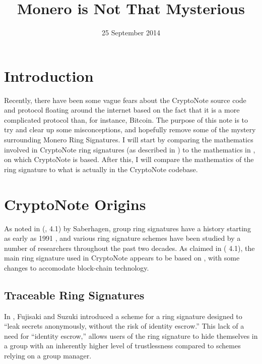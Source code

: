 \documentclass[12pt,english]{mrl}
\numberwithin{equation}{section}
\numberwithin{figure}{section}
\begin{document}
\begin{frontmatter}

\begin{fmbox}
\hfill\setlength{\fboxrule}{0px}\setlength{\fboxsep}{5px}
\title{Monero is Not That Mysterious}
\date{25 September 2014}
\author[
   addressref={mrl},
   email={lab@monero.cc}
]{ }


\address[id=mrl]{
}
\end{fmbox}



\end{frontmatter}

\section{Introduction}
Recently, there have been some vague fears about the CryptoNote
source code and protocol floating around the internet based on the
fact that it is a more complicated protocol than, for instance, Bitcoin.
The purpose of this note is to try and clear up some misconceptions,
and hopefully remove some of the mystery surrounding Monero Ring Signatures.
I will start by comparing the mathematics involved in CryptoNote
ring signatures (as described in \cite{CN}) to the mathematics in
\cite{FS}, on which CryptoNote is based. After this, I will compare
the mathematics of the ring signature to what is actually in the
CryptoNote codebase. 


\section{CryptoNote Origins}

As noted in (\cite{CN}, 4.1) by Saberhagen, group ring signatures have a history
starting as early as 1991 \cite{CH}, and various ring signature
schemes have been studied by a number of researchers throughout the
past two decades. As claimed in (\cite{CN} 4.1), the main ring signature
used in CryptoNote appears to be based on \cite{FS}, with some changes
to accomodate block-chain technology. 


\subsection{Traceable Ring Signatures}

In \cite{FS}, Fujisaki and Suzuki introduced a scheme for a ring
signature designed to ``leak secrets anonymously, without the risk
of identity escrow.'' This lack of a need for ``identity escrow,''
allows users of the ring signature to hide themselves in a group with
an inherently higher level of trustlessness compared to schemes relying
on a group manager.
\end{document}
